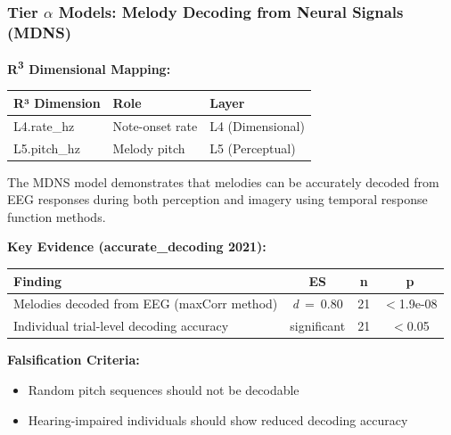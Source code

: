\documentclass[9pt,onecolumn]{article}
\newcommand{\Rthree}{R\textsuperscript{3}}
\newcommand{\cohend}[1]{\textit{d}~=~#1}
\begin{document}
\subsubsection{Tier $\alpha$ Models: Melody Decoding from Neural Signals (MDNS)}

\textbf{\Rthree{} Dimensional Mapping:}
\begin{center}
\small
\begin{tabular}{@{}lll@{}}
\toprule
\textbf{R³ Dimension} & \textbf{Role} & \textbf{Layer} \\
\midrule
L4.rate\_hz & Note-onset rate & L4 (Dimensional) \\
L5.pitch\_hz & Melody pitch & L5 (Perceptual) \\
\bottomrule
\end{tabular}
\end{center}

The MDNS model demonstrates that melodies can be accurately decoded from EEG responses during both perception and imagery using temporal response function methods.

\textbf{Key Evidence (accurate\_decoding 2021):}
\begin{center}
\small
\begin{tabular}{@{}lccc@{}}
\toprule
\textbf{Finding} & \textbf{ES} & \textbf{n} & \textbf{p} \\
\midrule
Melodies decoded from EEG (maxCorr method) & \cohend{0.80} & 21 & $<$1.9e-08 \\
Individual trial-level decoding accuracy & significant & 21 & $<$0.05 \\
\bottomrule
\end{tabular}
\end{center}

\textbf{Falsification Criteria:}
\begin{itemize}[leftmargin=*, topsep=0pt, itemsep=0pt]
\item Random pitch sequences should not be decodable
\item Hearing-impaired individuals should show reduced decoding accuracy
\end{itemize}
\end{document}
